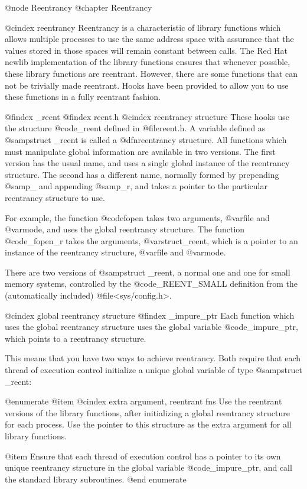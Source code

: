 @node Reentrancy
@chapter Reentrancy

@cindex reentrancy
Reentrancy is a characteristic of library functions which allows multiple
processes to use the same address space with assurance that the values stored
in those spaces will remain constant between calls. The Red Hat
newlib implementation of the library functions ensures that 
whenever possible, these library functions are reentrant.  However,
there are some functions that can not be trivially made reentrant.
Hooks have been provided to allow you to use these functions in a fully
reentrant fashion.

@findex _reent
@findex reent.h
@cindex reentrancy structure
These hooks use the structure @code{_reent} defined in @file{reent.h}.
A variable defined as @samp{struct _reent} is called a @dfn{reentrancy
structure}.  All functions which must manipulate global information are
available in two versions.  The first version has the usual name, and
uses a single global instance of the reentrancy structure.  The second
has a different name, normally formed by prepending @samp{_} and
appending @samp{_r}, and takes a pointer to the particular reentrancy
structure to use.

For example, the function @code{fopen} takes two arguments, @var{file}
and @var{mode}, and uses the global reentrancy structure.  The function
@code{_fopen_r} takes the arguments, @var{struct_reent}, which is a
pointer to an instance of the reentrancy structure, @var{file}
and @var{mode}.	

There are two versions of @samp{struct _reent}, a normal one and one
for small memory systems, controlled by the @code{_REENT_SMALL}
definition from the (automatically included) @file{<sys/config.h>}.

@cindex global reentrancy structure
@findex _impure_ptr
Each function which uses the global reentrancy structure uses the global
variable @code{_impure_ptr}, which points to a reentrancy structure.

This means that you have two ways to achieve reentrancy.  Both require
that each thread of execution control initialize a unique global
variable of type @samp{struct _reent}:

@enumerate
@item
@cindex extra argument, reentrant fns
Use the reentrant versions of the library functions, after initializing
a global reentrancy structure for each process.  Use the pointer to this
structure as the extra argument for all library functions.

@item
Ensure that each thread of execution control has a pointer to its own
unique reentrancy structure in the global variable @code{_impure_ptr},
and call the standard library subroutines.
@end enumerate

